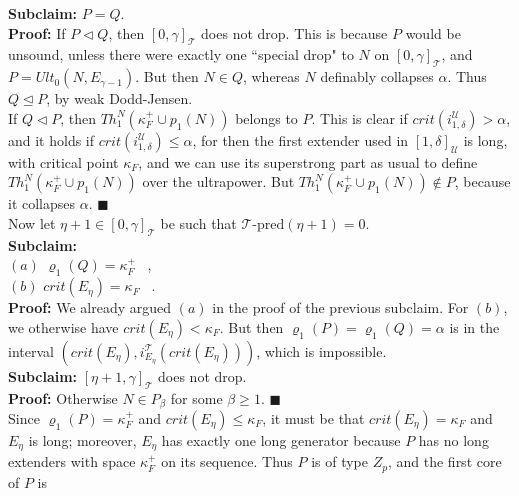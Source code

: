 \documentclass[12pt]{article}
\begin{document}
\textbf{Subclaim:} $P = Q$.\\

\textbf{Proof:} If $P \lhd Q$, then $[ 0 , \gamma ]_{\mathscr{T}}$ does not drop.  This is because $P$ would be unsound, unless there were exactly one ``special drop" to $N$ on $[ 0 , \gamma ]_{\mathscr{T}}$, and $P = Ult_0 (N, E_{\gamma - 1} )$.  But then $N \in Q$, whereas $N$ definably collapses $\alpha$.  Thus $Q \unlhd P$, by weak Dodd-Jensen.\\

If $Q \lhd P$, then $Th_1^N (\kappa_F^+ \cup p_1 (N))$ belongs to $P$.  This is clear if $crit (i_{1, \delta}^{\mathscr{U}} ) > \alpha$, and it holds if $crit (i_{1, \delta}^{\mathscr{U}}) \leq \alpha$, for then the first extender used in $[1, \delta]_{\mathscr{U}}$ is long, with critical point $\kappa_F$, and we can use its superstrong part as usual to define $Th_1^N (\kappa_F^+ \cup p_1 (N))$ over the ultrapower.  But $Th_1^N (\kappa_F^+ \cup p_1 (N)) \notin P$, because it collapses $\alpha$. $\blacksquare$\\

Now let $\eta + 1 \in [ 0 , \gamma ]_{\mathscr{T}}$ be such that $\mathscr{T} \text{-pred} (\eta + 1) = 0$.\\

\textbf{Subclaim:}\\

\indent \indent $(a)$ $\varrho_1 (Q) = \kappa_F^+$ \ ,\\

\indent \indent $(b)$ $crit (E_\eta) = \kappa_F$ \ .\\

\textbf{Proof:} We already argued $(a)$ in the proof of the previous subclaim.  For $(b)$, we otherwise have $crit (E_\eta) < \kappa_F$.  But then $\varrho_1 (P) = \varrho_1 (Q) = \alpha$ is in the interval $( crit (E_\eta ) , i_{E_\eta}^{\mathscr{T}} (crit (E_\eta)))$, which is impossible.\\

\textbf{Subclaim:} $[ \eta + 1 , \gamma ]_{\mathscr{T}}$ does not drop.\\

\textbf{Proof:}  Otherwise $N \in P_\beta$ for some $\beta \geq 1$. $\blacksquare$\\

Since $\varrho_1 (P) = \kappa_F^+$ and $crit (E_\eta ) \leq \kappa_F$, it must be that $crit (E_\eta) = \kappa_F$ and $E_\eta$ is long; moreover, $E_\eta$ has exactly one long generator because $P$ has no long extenders with space $\kappa_F^+$ on its sequence.  Thus $P$ is of type $Z_p$, and the first core of $P$ is
\end{document}
